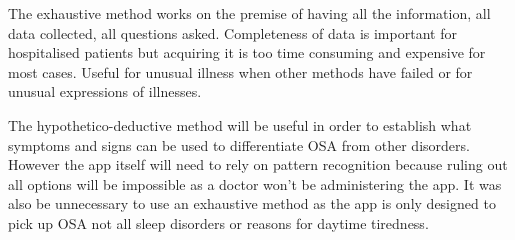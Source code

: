 The exhaustive method works on the premise of having all the information, all data collected, all questions asked. Completeness of data is important for hospitalised patients but acquiring it is too time consuming and expensive for most cases. Useful for unusual illness when other methods have failed or for unusual expressions of illnesses. 

The hypothetico-deductive method will be useful in order to establish what symptoms and signs can be used to differentiate OSA from other disorders. However the app itself will need to rely on pattern recognition because ruling out all options will be impossible as a doctor won’t be administering the app. It was also be unnecessary to use an exhaustive method as the app is only designed to pick up OSA not all sleep disorders or reasons for daytime tiredness. 